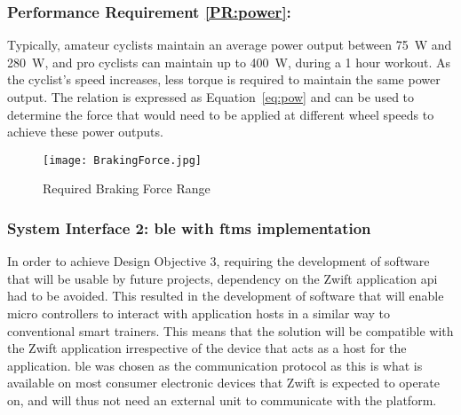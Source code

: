 \subsubsection{Performance Requirement \ref{PR:power}:}

Typically, amateur cyclists maintain an average power output between \SI{75}{\watt} and \SI{280}{\watt}, and pro cyclists can maintain up to \SI{400}{\watt}, during a 1 hour workout. As the cyclist's speed increases, less torque is required to maintain the same power output. The relation is expressed as Equation~\ref{eq:pow} and can be used to determine the force that would need to be applied at different wheel speeds to achieve these power outputs.

\begin{figure}[H]
	\begin{center}
		\texttt{[image: BrakingForce.jpg]}
		\caption{Required Braking Force Range}
		\label{fig:force}
	\end{center}
\end{figure}

\subsubsection{System Interface 2: \ac{ble} with \ac{ftms} implementation}

In order to achieve Design Objective 3, requiring the development of software that will be usable by future projects, dependency on the Zwift application \ac{api} had to be avoided. This resulted in the development of software that will enable micro controllers to interact with application hosts in a similar way to conventional smart trainers. This means that the solution will be compatible with the Zwift application irrespective of the device that acts as a host for the application. \ac{ble} was chosen as the communication protocol as this is what is available on most consumer electronic devices that Zwift is expected to operate on, and will thus not need an external unit to communicate with the platform.

